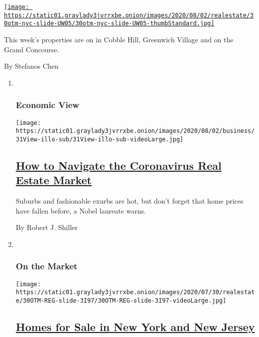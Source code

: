 \begin{enumerate}
\begin{enumerate}
    \href{/2020/07/30/realestate/homes-for-sale-in-brooklyn-manhattan-and-the-bronx.html}{\texttt{[image: https://static01.graylady3jvrrxbe.onion/images/2020/08/02/realestate/30otm-nyc-slide-UW05/30otm-nyc-slide-UW05-thumbStandard.jpg]}}

    This week's properties are on in Cobble Hill, Greenwich Village and
    on the Grand Concourse.

    By Stefanos Chen
  \end{enumerate}
\end{enumerate}

\begin{enumerate}
\def\labelenumi{\arabic{enumi}.}
\item ~
  \hypertarget{economic-view}{%
  \subsubsection{Economic View}\label{economic-view}}

  \texttt{[image: https://static01.graylady3jvrrxbe.onion/images/2020/08/02/business/31View-illo-sub/31View-illo-sub-videoLarge.jpg]}

  \hypertarget{how-to-navigate-the-coronavirus-real-estate-market}{%
  \subsection{\texorpdfstring{\href{/2020/07/31/business/housing-market-prices-risk.html}{How
  to Navigate the Coronavirus Real Estate
  Market}}{How to Navigate the Coronavirus Real Estate Market}}\label{how-to-navigate-the-coronavirus-real-estate-market}}

  Suburbs and fashionable exurbs are hot, but don't forget that home
  prices have fallen before, a Nobel laureate warns.

  By Robert J. Shiller
\item ~
  \hypertarget{on-the-market-1}{%
  \subsubsection{On the Market}\label{on-the-market-1}}

  \texttt{[image: https://static01.graylady3jvrrxbe.onion/images/2020/07/30/realestate/30OTM-REG-slide-3I97/30OTM-REG-slide-3I97-videoLarge.jpg]}

  \hypertarget{homes-for-sale-in-new-york-and-new-jersey}{%
  \subsection{\texorpdfstring{\href{/2020/07/30/realestate/homes-for-sale-in-new-york-and-new-jersey.html}{Homes
  for Sale in New York and New
  Jersey}}{Homes for Sale in New York and New Jersey}}\label{homes-for-sale-in-new-york-and-new-jersey}}


\end{enumerate}
